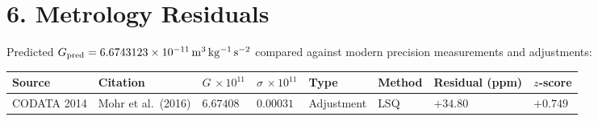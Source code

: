 \documentclass[
  11pt,
  letterpaper,
  twocolumn,
]{article}
\begin{document}
\section{6. Metrology Residuals}\label{metrology-residuals}

Predicted
\(G_{\rm pred} = 6.6743123 \times 10^{-11}\,\mathrm{m^3\,kg^{-1}\,s^{-2}}\)
compared against modern precision measurements and adjustments:

\begin{table}[!htb]
\centering\small
\begin{tabular}{@{}
  >{\raggedright\arraybackslash}p{}
  >{\raggedright\arraybackslash}p{}
  >{\raggedright\arraybackslash}p{}
  >{\raggedright\arraybackslash}p{}
  >{\raggedright\arraybackslash}p{}
  >{\raggedright\arraybackslash}p{}
  >{\raggedright\arraybackslash}p{}
  >{\raggedright\arraybackslash}p{}@{}}
\toprule
\begin{minipage}[b]{\linewidth}\raggedright
Source
\end{minipage} & \begin{minipage}[b]{\linewidth}\raggedright
Citation
\end{minipage} & \begin{minipage}[b]{\linewidth}\raggedright
\(G\,\times\!10^{11}\)
\end{minipage} & \begin{minipage}[b]{\linewidth}\raggedright
\(\sigma\,\times\!10^{11}\)
\end{minipage} & \begin{minipage}[b]{\linewidth}\raggedright
Type
\end{minipage} & \begin{minipage}[b]{\linewidth}\raggedright
Method
\end{minipage} & \begin{minipage}[b]{\linewidth}\raggedright
Residual (ppm)
\end{minipage} & \begin{minipage}[b]{\linewidth}\raggedright
\(z\)-score
\end{minipage} \\
\midrule
CODATA 2014 & Mohr et al.~(2016) & \(6.67408\) & \(0.00031\) &
Adjustment & LSQ & \(+34.80\) & \(+0.749\) \\

\end{tabular}
\end{table}
\end{document}
